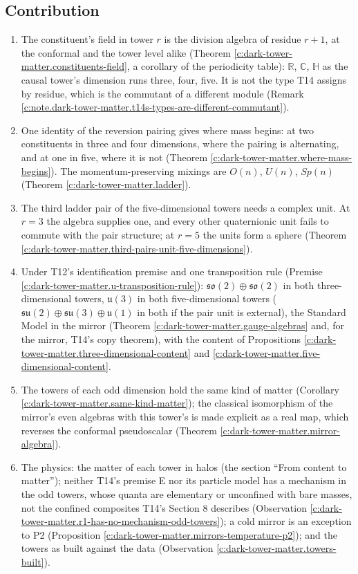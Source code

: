 \documentclass[11pt]{article}
\theoremstyle{definition}
\theoremstyle{plain}
\providecommand{\C}{}\renewcommand{\C}{\mathbb{C}}
\providecommand{\HH}{}\renewcommand{\HH}{\mathbb{H}}
\providecommand{\R}{}\renewcommand{\R}{\mathbb{R}}
\providecommand{\so}{}\renewcommand{\so}{\mathfrak{so}}
\providecommand{\su}{}\renewcommand{\su}{\mathfrak{su}}
\providecommand{\uu}{}\renewcommand{\uu}{\mathfrak{u}}
\begin{document}
\subsection*{Contribution}
\label{c:note.dark-tower-matter.setting-contribution}
\begin{enumerate}
\item The constituent's field in tower $r$ is the division algebra of residue $r + 1$, at the conformal and the tower level alike (Theorem \ref{c:dark-tower-matter.constituents-field}, a corollary of the periodicity table): $\R$, $\C$, $\HH$ as the causal tower's dimension runs three, four, five. It is not the type T14 assigns by residue, which is the commutant of a different module (Remark \ref{c:note.dark-tower-matter.t14s-types-are-different-commutant}).
\item One identity of the reversion pairing gives where mass begins: at two constituents in three and four dimensions, where the pairing is alternating, and at one in five, where it is not (Theorem \ref{c:dark-tower-matter.where-mass-begins}). The momentum-preserving mixings are $O(n)$, $U(n)$, $Sp(n)$ (Theorem \ref{c:dark-tower-matter.ladder}).
\item The third ladder pair of the five-dimensional towers needs a complex unit. At $r = 3$ the algebra supplies one, and every other quaternionic unit fails to commute with the pair structure; at $r = 5$ the units form a sphere (Theorem \ref{c:dark-tower-matter.third-pairs-unit-five-dimensions}).
\item Under T12's identification premise and one transposition rule (Premise \ref{c:dark-tower-matter.u-transposition-rule}): $\so(2) \oplus \so(2)$ in both three-dimensional towers, $\uu(3)$ in both five-dimensional towers ($\su(2) \oplus \su(3) \oplus \uu(1)$ in both if the pair unit is external), the Standard Model in the mirror (Theorem \ref{c:dark-tower-matter.gauge-algebras} and, for the mirror, T14's copy theorem), with the content of Propositions \ref{c:dark-tower-matter.three-dimensional-content} and \ref{c:dark-tower-matter.five-dimensional-content}.
\item The towers of each odd dimension hold the same kind of matter (Corollary \ref{c:dark-tower-matter.same-kind-matter}); the classical isomorphism of the mirror's even algebras with this tower's is made explicit as a real map, which reverses the conformal pseudoscalar (Theorem \ref{c:dark-tower-matter.mirror-algebra}).
\item The physics: the matter of each tower in halos (the section ``From content to matter''); neither T14's premise E nor its particle model has a mechanism in the odd towers, whose quanta are elementary or unconfined with bare masses, not the confined composites T14's Section 8 describes (Observation \ref{c:dark-tower-matter.r1-has-no-mechanism-odd-towers}); a cold mirror is an exception to P2 (Proposition \ref{c:dark-tower-matter.mirrors-temperature-p2}); and the towers as built against the data (Observation \ref{c:dark-tower-matter.towers-built}).
\end{enumerate}
\end{document}
